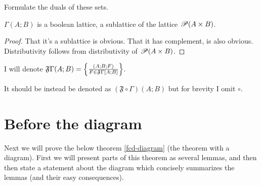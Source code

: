 \begin{xca}
Formulate the duals of these sets.\end{xca}
\begin{prop}
$\Gamma(A;B)$ is a boolean lattice, a sublattice of the lattice $\mathscr{P}(A\times B)$.\end{prop}
\begin{proof}
That it's a sublattice is obvious. That it has complement, is also
obvious. Distributivity follows from distributivity of $\mathscr{P}(A\times B)$.
\end{proof}
I will denote $\mathfrak{F}\Gamma(A;B)=\left\{ \frac{(A;B;F)}{F\in\mathfrak{F}\Gamma[A;B]}\right\}$.
\begin{rem}
It should be instead be denoted as $(\mathfrak{F}\circ\Gamma)(A;B)$
but for brevity I omit $\circ$.
\end{rem}

\section{Before the diagram}

Next we will prove the below theorem \ref{fcd-diagram} (the theorem
with a diagram). First we will present parts of this theorem as several
lemmas, and then then state a statement about the diagram which concisely
summarizes the lemmas (and their easy consequences).

